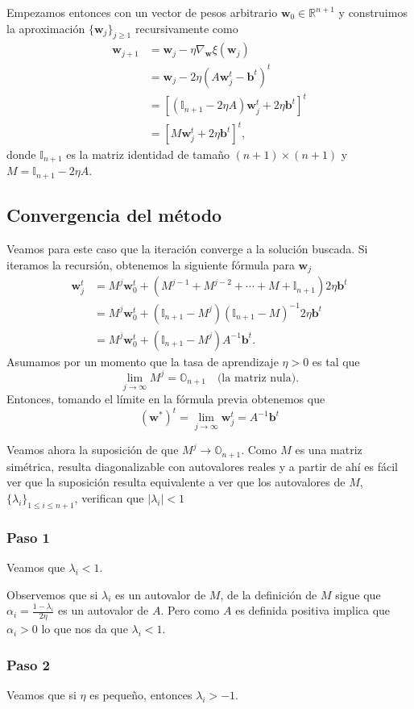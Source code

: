\documentclass[12pt, a4paper]{amsbook}
\newcommand{\R}{{\mathbb R}}
\newcommand{\II}{{\mathbb I}}
\newcommand{\OO}{{\mathbb O}}
\newcommand{\ww}{{\mathbf w}}
\newcommand{\bb}{{\mathbf b}}
\theoremstyle{remark}
\theoremstyle{definition}
\numberwithin{section}{chapter}
\numberwithin{subsection}{section}
\numberwithin{equation}{section}
\numberwithin{figure}{chapter}
\begin{document}
Empezamos entonces con un vector de pesos arbitrario $\ww_0\in\R^{n+1}$ y construimos la aproximación $\{\ww_j\}_{j\ge 1}$ recursivamente como
\begin{align*}
\ww_{j+1} &= \ww_j - \eta \nabla_\ww \xi(\ww_j) \\
&= \ww_j - 2\eta (A\ww_j^t - \bb^t)^t\\
&= [(\II_{n+1} - 2\eta A)\ww_j^t + 2\eta\bb^t]^t\\
&=[M\ww_j^t + 2\eta\bb^t]^t,
\end{align*}
donde $\II_{n+1}$ es la matriz identidad de tamaño $(n+1)\times(n+1)$ y $M=\II_{n+1} - 2\eta A$.

\subsection*{Convergencia del método} Veamos para este caso que la iteración converge a la solución buscada. Si iteramos la recursión, obtenemos la siguiente fórmula para $\ww_j$
\begin{align*}
\ww_j^t &= M^j \ww_0^t + (M^{j-1} + M^{j-2} + \cdots + M + \II_{n+1})2\eta\bb^t\\
&= M^j \ww_0^t + (\II_{n+1}-M^j)(\II_{n+1} - M)^{-1}2\eta\bb^t\\
&= M^j \ww_0^t + (\II_{n+1} - M^j) A^{-1}\bb^t.
\end{align*}
Asumamos por un momento que la tasa de aprendizaje $\eta>0$ es tal que 
$$
\lim_{j\to\infty} M^j = \OO_{n+1} \quad \text{(la matriz nula)}.
$$
Entonces, tomando el límite en la fórmula previa obtenemos que
$$
(\ww^*)^t = \lim_{j\to\infty} \ww_j^t = A^{-1}\bb^t
$$

Veamos ahora la suposición de que $M^j\to \OO_{n+1}$. Como $M$ es una matriz simétrica, resulta diagonalizable con autovalores reales y a partir de ahí es fácil ver que la suposición resulta equivalente a ver que los autovalores de $M$, $\{\lambda_i\}_{1\le i\le n+1}$, verifican que $|\lambda_i|<1$

\subsubsection*{Paso 1} Veamos que $\lambda_i<1$.

Observemos que si $\lambda_i$ es un autovalor de $M$, de la definición de $M$ sigue que $\alpha_i = \frac{1-\lambda_i}{2\eta}$ es un autovalor de $A$. Pero como $A$ es definida positiva implica que $\alpha_i>0$ lo que nos da que $\lambda_i<1$.

\subsubsection*{Paso 2} Veamos que si $\eta$ es pequeño, entonces $\lambda_i>-1$.
\end{document}

